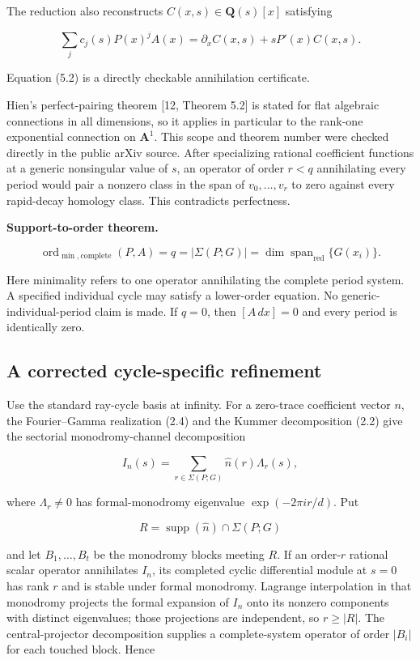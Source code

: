 \documentclass[
  11pt,
  a4paper,
]{amsart}
\begin{document}
The reduction also reconstructs \(C(x,s)\in\mathbf Q(s)[x]\) satisfying

\[
\sum_j c_j(s)P(x)^jA(x)
=\partial_xC(x,s)+sP'(x)C(x,s).                         \tag{5.2}
\]

Equation (5.2) is a directly checkable annihilation certificate.

Hien's perfect-pairing theorem {[}12, Theorem 5.2{]} is stated for flat
algebraic connections in all dimensions, so it applies in particular to
the rank-one exponential connection on \(\mathbf A^1\). This scope and
theorem number were checked directly in the public arXiv source. After
specializing rational coefficient functions at a generic nonsingular
value of \(s\), an operator of order \(r<q\) annihilating every period
would pair a nonzero class in the span of \(v_0,\ldots,v_r\) to zero
against every rapid-decay homology class. This contradicts perfectness.

\textbf{Support-to-order theorem.}

\[
\boxed{
\operatorname{ord}_{\min,\mathrm{complete}}(P,A)
=q
=|\Sigma(P;G)|
=\dim\operatorname{span}_{\mathrm{red}}\{G(x_i)\}.
}                                                        \tag{5.3}
\]

Here minimality refers to one operator annihilating the complete period
system. A specified individual cycle may satisfy a lower-order equation.
No generic-individual-period claim is made. If \(q=0\), then
\([A\,dx]=0\) and every period is identically zero.

\subsection{A corrected cycle-specific refinement}

Use the standard ray-cycle basis at infinity. For a zero-trace
coefficient vector \(n\), the Fourier--Gamma realization (2.4) and the
Kummer decomposition (2.2) give the sectorial monodromy-channel
decomposition

\[
I_n(s)=\sum_{r\in\Sigma(P;G)}\widehat n(r)\Lambda_r(s),
\]

where \(\Lambda_r\ne0\) has formal-monodromy eigenvalue
\(\exp(-2\pi i r/d)\). Put

\[
R=\operatorname{supp}(\widehat n)\cap\Sigma(P;G)
\]

and let \(B_1,\ldots,B_t\) be the monodromy blocks meeting \(R\). If an
order-\(r\) rational scalar operator annihilates \(I_n\), its completed
cyclic differential module at \(s=0\) has rank \(r\) and is stable under
formal monodromy. Lagrange interpolation in that monodromy projects the
formal expansion of \(I_n\) onto its nonzero components with distinct
eigenvalues; those projections are independent, so \(r\ge |R|\). The
central-projector decomposition supplies a complete-system operator of
order \(|B_i|\) for each touched block. Hence
\end{document}
